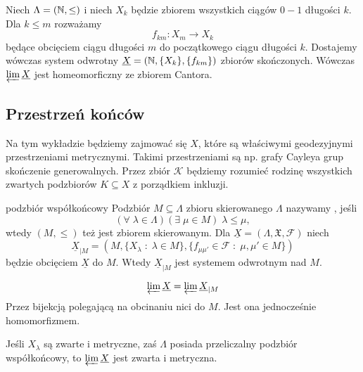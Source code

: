 \begin{example}{}{}
  Niech $\Lambda=(\mathbb{N}, \leq)$ i niech $X_k$ będzie zbiorem wszystkich ciągów $0-1$ długości $k$. Dla $k\leq m$ rozważamy 
  $$f_{km}:X_m\to X_k$$
  będące obcięciem ciągu długości $m$ do początkowego ciągu długości $k$. Dostajemy wówczas system odwrotny $\underline{X}=(\mathbb{N}, \{X_k\}, \{f_{km}\})$ zbiorów skończonych. Wówczas $\varprojlim\underline{X}$ jest homeomorficzny ze zbiorem Cantora.
\end{example}

\subsection{Przestrzeń końców}

Na tym wykładzie będziemy zajmować się $X$, które są właściwymi geodezyjnymi przestrzeniami metrycznymi. Takimi przestrzeniami są np. grafy Cayleya grup skończenie generowalnych. Przez zbiór $\mathcal{K}$ będziemy rozumieć rodzinę wszystkich zwartych podzbiorów $K\subseteq X$ z porządkiem inkluzji.


\begin{definition}{podzbiór współkońcowy}{}
  Podzbiór $M\subseteq\Lambda$ zbioru skierowanego $\Lambda$ nazywamy , jeśli 
  $$(\forall\;\lambda\in\Lambda)(\exists\;\mu\in M)\;\lambda\leq\mu,$$ 
  wtedy $(M, \leq)$ też jest zbiorem skierowanym. Dla $\underline{X}=(\Lambda, \mathfrak{X}, \mathcal{F})$ niech 
  $$\underline{X}_{|M}=(M, \{X_\lambda\;:\;\lambda\in M\}, \{f_{\mu\mu'}\in\mathcal{F}\;:\;\mu,\mu'\in M\})$$
  będzie obcięciem $\underline{X}$ do $M$. Wtedy $\underline{X}_{|M}$ jest systemem odwrotnym nad $M$.
\end{definition}

\begin{fact}{}{}
  $$\varprojlim\underline{X}=\varprojlim\underline{X}_{|M}$$
  Przez bijekcją polegającą na obcinaniu nici do $M$. Jest ona jednocześnie homomorfizmem.
\end{fact}

\begin{conclusion}{}{} 
  Jeśli $X_\lambda$ są zwarte i metryczne, zaś $\Lambda$ posiada przeliczalny podzbiór współkońcowy, to $\varprojlim\underline{X}$ jest zwarta i metryczna.
\end{conclusion}

